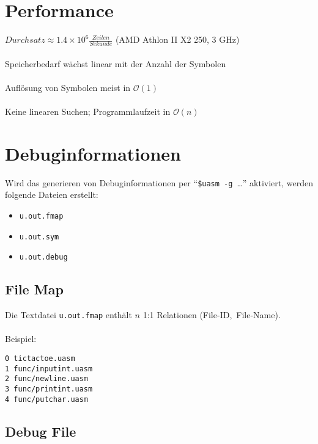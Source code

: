 \section{Performance}

\begin{frame}[fragile]{\insertsection}
    $Durchsatz \approx 1.4 \times 10^6 \frac{Zeilen}{Sekunde}$
    (AMD Athlon II X2 250, 3 GHz) \\~\\
    Speicherbedarf wächst linear mit der Anzahl der Symbolen \\~\\
    Auflösung von Symbolen meist in $\mathcal{O}(1)$ \\~\\
    Keine linearen Suchen; Programmlaufzeit in $\mathcal{O}(n)$
\end{frame}

\section{Debuginformationen}

\begin{frame}{\insertsection}
    Wird das generieren von Debuginformationen per ``\texttt{\$uasm~-g}~\ldots''
    aktiviert, werden folgende Dateien erstellt:
    \begin{itemize}
        \item \texttt{u.out.fmap}
        \item \texttt{u.out.sym}
        \item \texttt{u.out.debug}
    \end{itemize}
\end{frame}

\subsection{File Map}

\begin{frame}[fragile]{\insertsubsection}
    Die Textdatei \texttt{u.out.fmap} enthält $n$ 1:1 Relationen (File-ID,~File-Name).
    \\~\\
    Beispiel:
\begin{verbatim}
0 tictactoe.uasm
1 func/inputint.uasm
2 func/newline.uasm
3 func/printint.uasm
4 func/putchar.uasm
\end{verbatim}
\end{frame}

\subsection{Debug File}

